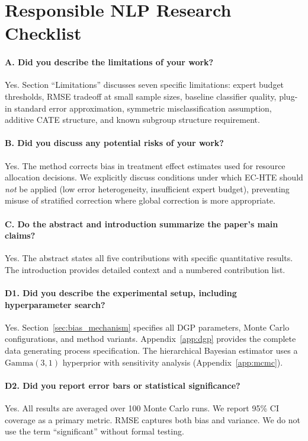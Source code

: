 \section*{Responsible NLP Research Checklist}

\paragraph{A. Did you describe the limitations of your work?}
Yes. Section ``Limitations'' discusses seven specific limitations: expert budget thresholds, RMSE tradeoff at small sample sizes, baseline classifier quality, plug-in standard error approximation, symmetric misclassification assumption, additive CATE structure, and known subgroup structure requirement.

\paragraph{B. Did you discuss any potential risks of your work?}
Yes. The method corrects bias in treatment effect estimates used for resource allocation decisions. We explicitly discuss conditions under which EC-HTE should \textit{not} be applied (low error heterogeneity, insufficient expert budget), preventing misuse of stratified correction where global correction is more appropriate.

\paragraph{C. Do the abstract and introduction summarize the paper's main claims?}
Yes. The abstract states all five contributions with specific quantitative results. The introduction provides detailed context and a numbered contribution list.

\paragraph{D1. Did you describe the experimental setup, including hyperparameter search?}
Yes. Section~\ref{sec:bias_mechanism} specifies all DGP parameters, Monte Carlo configurations, and method variants. Appendix~\ref{app:dgp} provides the complete data generating process specification. The hierarchical Bayesian estimator uses a $\text{Gamma}(3, 1)$ hyperprior with sensitivity analysis (Appendix~\ref{app:mcmc}).

\paragraph{D2. Did you report error bars or statistical significance?}
Yes. All results are averaged over 100 Monte Carlo runs. We report 95\% CI coverage as a primary metric. RMSE captures both bias and variance. We do not use the term ``significant'' without formal testing.

